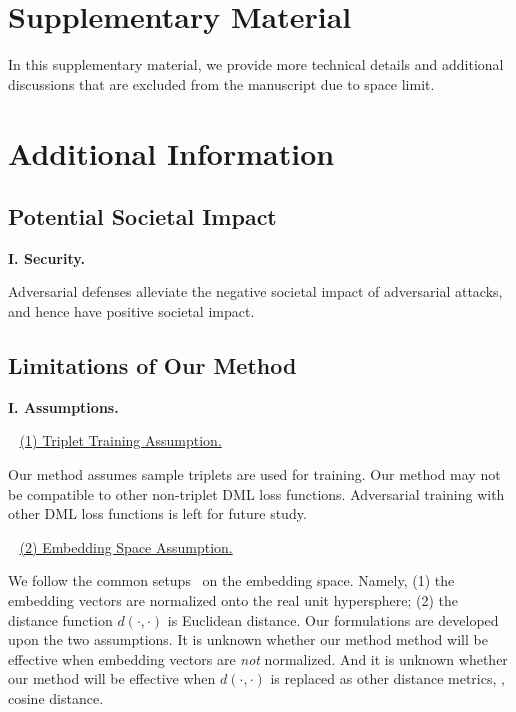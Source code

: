 \clearpage
\appendix

\setcounter{figure}{8}
\setcounter{table}{6}

\section*{Supplementary Material}

In this supplementary material, we provide more technical details and
additional discussions that are excluded from the manuscript due to space
limit.

\tableofcontents

\section{Additional Information}
\label{sec:a}

\subsection{Potential Societal Impact}
\label{sec:a1}

\noindent\textbf{I. Security.}

Adversarial defenses alleviate the negative societal impact of adversarial
attacks, and hence have positive societal impact.

\subsection{Limitations of Our Method}
\label{sec:a2}

\noindent\textbf{I. Assumptions.}

~\newline
\noindent \ul{(1) Triplet Training Assumption.}

Our method assumes sample triplets are used for training.
%
Our method may not be compatible to other non-triplet DML loss functions.
%
Adversarial training with other DML loss functions is left for future study.

~\newline
\noindent \ul{(2) Embedding Space Assumption.}

We follow the common setups~\cite{revisiting,robrank} on the embedding space.
%
Namely, (1) the embedding vectors are normalized onto the real unit
hypersphere;
%
(2) the distance function $d(\cdot,\cdot)$ is Euclidean distance.
%
Our formulations are developed upon the two assumptions.
%
It is unknown whether our method method will be effective when embedding
vectors are \emph{not} normalized.
%
And it is unknown whether our method will be effective when $d(\cdot,\cdot)$ is
replaced as other distance metrics, \eg, cosine distance.

